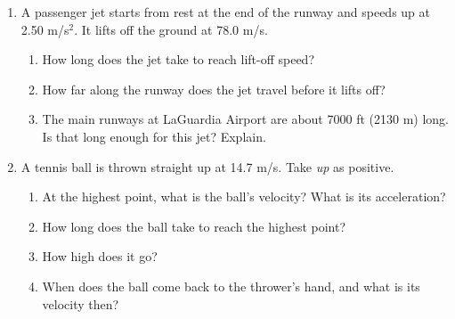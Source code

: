 \documentclass[12pt, twoside]{article}
\begin{document}
\begin{enumerate}[itemsep=0.6cm]
  \begin{enumerate}[itemsep=0.6cm]
    \item Where does the student end up?
      \vspace{0.6cm}
    \item Find the total distance walked.
      \vspace{0.6cm}
    \item Find the net displacement.
      \vspace{0.6cm}
    \item Find the average speed and the average velocity for the whole walk.
  \end{enumerate}

\newpage

\item A passenger jet starts from rest at the end of the runway and speeds up at
  2.50 m/s$^2$. It lifts off the ground at 78.0 m/s.
  \begin{enumerate}[itemsep=0.4cm]
    \item How long does the jet take to reach lift-off speed?
      \vspace{2.4cm}
    \item How far along the runway does the jet travel before it lifts off?
      \vspace{3.0cm}
    \item The main runways at LaGuardia Airport are about 7000 ft (2130 m) long.
      Is that long enough for this jet? Explain.
      \vspace{0.6cm}
  \end{enumerate}

\item A tennis ball is thrown straight up at 14.7 m/s. Take \emph{up} as positive.
  \begin{enumerate}[itemsep=0.4cm]
    \item At the highest point, what is the ball's velocity? What is its
      acceleration?
      \vspace{0.8cm}
    \item How long does the ball take to reach the highest point?
      \vspace{1.9cm}
    \item How high does it go?
      \vspace{2.0cm}
    \item When does the ball come back to the thrower's hand, and what is its
      velocity then?
  \end{enumerate}


\end{enumerate}
\end{document}
